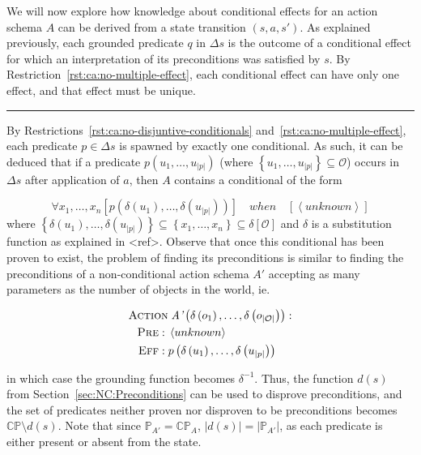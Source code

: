 \documentclass[../Master.tex]{subfiles}
\begin{document}
We will now explore how knowledge about conditional effects for an action schema $A$ can be derived from a  state transition $\left( s, a ,s' \right)$. As explained previously, each grounded predicate $q$ in $\Delta s$ is the outcome of a conditional effect for which an interpretation of its preconditions was satisfied by $s$. By Restriction~\ref{rst:ca:no-multiple-effect}, each conditional effect can have only one effect, and that effect must be unique. 

\noindent\rule{\textwidth}{1pt}

By Restrictions~\ref{rst:ca:no-disjuntive-conditionals} and~\ref{rst:ca:no-multiple-effect}, each predicate $p \in \Delta s$ is spawned by exactly one conditional. As such, it can be deduced that if a predicate $p\left(u_1, \dots, u_{|p|}\right)$ (where $\left\{u_1, \dots, u_{|p|}\right\} \subseteq \mathcal{O}$) occurs in $\Delta s$ after application of $a$, then $A$ contains a conditional of the form

\begin{equation*}
    \forall x_1, \dots, x_n 
        \left[ p\left(\delta\left(u_1\right), \dots, \delta \left(u_{|p|}\right) \right) \right] \quad when \quad 
        \left[ \left<unknown\right> \right]
\end{equation*}
where $\left\{\delta \left( u_1 \right), \dots, \delta \left(u_{|p|} \right) \right\} \subseteq \left\{ x_1, \dots, x_n \right\} \subseteq \delta [\mathcal{O}]$ and $\delta$ is a substitution function as explained in <ref>. Observe that once this conditional has been proven to exist, the problem of finding its preconditions is similar to finding the preconditions of a non-conditional action schema $A'$ accepting as many parameters as the number of objects in the world, ie. 

\begin{align*}
    \begin{split}
        \textsc{Action} &\; \textit{A'}\left(\delta \left( o_1 \right), \ldots, \delta \left( o_{|\mathcal{O}|}\right)\right): \\
        \textsc{Pre}: \; & \left< unknown \right> \\
        \textsc{Eff}: \; & p\left( \delta \left(u_1\right), \dots, \delta \left( u_{|p|} \right)\right)
    \end{split}
\end{align*}

in which case the grounding function becomes $\delta^{-1}$. Thus, the function $d(s)$ from Section~\ref{sec:NC:Preconditions} can be used to disprove preconditions, and the set of predicates neither proven nor disproven to be preconditions becomes $\mathbb{CP} \setminus d(s)$. Note that since $\mathbb{P}_{A'} = \mathbb{CP}_A$, $|d(s)| = |\mathbb{P}_{A'}|$, as each predicate is either present or absent from the state. 
\end{document}
